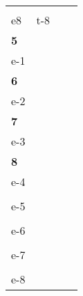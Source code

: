 \documentclass[12pt]{article}
\begin{document}
\begin{tabular}{p{1.75in}|p{1.75in}|p{1.75in}|p{1.75in}}
\huge{\textbf{}}  & \huge{\textbf{}}         & & \\ 
e8                & t-8                      & & \\ \hline
\huge{\textbf{5}} & & & \\ 
e-1               & & & \\ \hline
\huge{\textbf{6}} & & & \\ 
e-2               & & & \\ \hline
\huge{\textbf{7}} & & & \\ 
e-3               & & & \\ \hline
%
\huge{\textbf{8}} & & & \\ 
e-4               & & & \\ \hline
\huge{\textbf{}}  & & & \\ 
e-5               & & & \\ \hline
\huge{\textbf{}}  & & & \\ 
e-6               & & & \\ \hline
%
\huge{\textbf{}}  & & & \\ 
e-7               & & & \\ \hline
\huge{\textbf{}}  & & & \\ 
e-8               & & & \\ \hline

\end{tabular}
\end{document}
